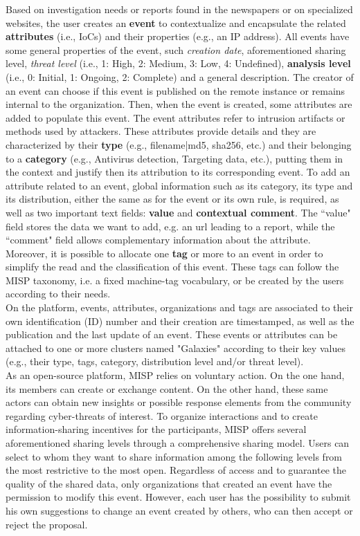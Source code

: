 \documentclass[unnumsec,webpdf,contemporary,large]{oup-authoring-template}%
\theoremstyle{thmstyleone}%
\theoremstyle{thmstyletwo}%
\theoremstyle{thmstylethree}%
\begin{document}
\begin{appendices}
Based on investigation needs or reports found in the newspapers or on specialized websites, the user creates an \textbf{event} to contextualize and encapsulate the related \textbf{attributes} (i.e., IoCs) and their properties (e.g., an IP address). All events have some general properties of the event, such {\it creation date}, aforementioned sharing level, {\it threat level} (i.e., 1: High, 2: Medium, 3: Low, 4: Undefined),  \textbf{analysis level} (i.e., 0: Initial, 1: Ongoing, 2: Complete) and a general description. The creator of an event can choose if this event is published on the remote instance or remains internal to the organization. Then, when the event is created, some attributes are added to populate this event. The event attributes refer to intrusion artifacts or methods used by  attackers. These attributes provide details and they are characterized by their \textbf{type} (e.g., filename|md5, sha256, etc.) and their belonging to a \textbf{category} (e.g., Antivirus detection, Targeting data, etc.), putting them in the context and justify then its attribution to its corresponding event. To add an attribute related to an event, global information such as its category, its type and its distribution, either the same as for the event or its own rule, is required, as well as two important text fields: \textbf{value} and \textbf{contextual comment}. The ``value" field stores the data we want to add, e.g. an url leading to a report, while the ``comment" field allows complementary information about the attribute. Moreover, it is possible to allocate one \textbf{tag} or more to an event in order to simplify the read and the classification of this event. These tags can follow the MISP taxonomy, i.e. a fixed machine-tag vocabulary, or be created by the users according to their needs.\\

On the platform, events, attributes, organizations and tags are associated to their own identification (ID) number and their creation are timestamped, as well as the publication and the last update of an event. These events or attributes can be attached to one or more clusters named "Galaxies" according to their key values (e.g., their type, tags, category, distribution level and/or threat level).\\

As an open-source platform, MISP relies on voluntary action. On the one hand, its members can create or exchange content. On the other hand, these same actors can obtain new insights or possible response elements from the community regarding cyber-threats of interest. To organize interactions and to create information-sharing incentives for the participants, MISP offers several aforementioned sharing levels through a comprehensive sharing model. Users can select to whom they want to share information among the following levels from the most restrictive to the most open. Regardless of access and to guarantee the quality of the shared data, only organizations that created an event have the permission to modify this event. However, each user has the possibility to submit his own suggestions to change an event created by others, who can then accept or reject the proposal.\\


\end{appendices}
\end{document}
